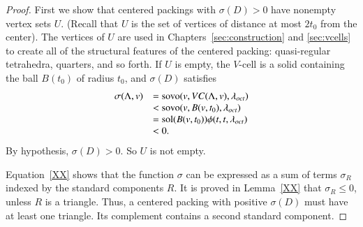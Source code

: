 \begin{proof}
First we show that centered packings with $\sigma(D)>0$ have
nonempty vertex sets $U$. (Recall that $U$ is the set of vertices
of distance at most $2t_0$ from the center).  The vertices of $U$
are used in Chapters~\ref{sec:construction} and \ref{sec:vcells} to
create all of the structural features of the centered packing:
quasi-regular tetrahedra, quarters, and so forth. If $U$ is empty,
the $V$-cell is a solid containing the ball $B(t_0)$ of radius
$t_0$, and $\sigma(D)$ satisfies
    $$
    \begin{array}{lll}
    \sigma(\Lambda,v) &= {\operatorname{sovo}}(v,VC(\Lambda,v),\lambda_{oct})\\
              &< {\operatorname{sovo}}(v,B(v,t_0),\lambda_{oct})\\
              &= \operatorname{sol}(B(v,t_0))\phi(t,t,\lambda_{oct})\\
              &< 0.
    \end{array}
    $$
By hypothesis, $\sigma(D)>0$.  So $U$ is not empty.

Equation~\ref{XX} shows that the function $\sigma$ can be
expressed as a sum of terms $\sigma_R$ indexed by the standard
components $R$. It is proved in Lemma~\ref{XX} that
$\sigma_R\le0$, unless $R$ is a triangle. Thus, a centered packing
with positive $\sigma(D)$ must have at least one triangle. Its
complement contains a second standard component. 
\end{proof}

